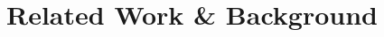 \begin{comment}
While generic PCI-Passthrough can be used with IOMMU technologies to pass through various PCI-Express devices, GPUs represent a special case which has hampered usage until only recently. In traditional usage, GPUs usually serve as VGA devices primarily to render screen output and while the purposes of scientific computing using GPUs do not require this function, it still exists in legacy. In GPU-Passthrough, another VGA device (such as onboard graphics built into the motherboard) is necessary to serve as the primary display for the host, as well as providing emulated VGA devices for each guest VM. Most GPUs also have a video bios that requires full inititialization and reset functions, which is often difficult due to the proprietary nature of the cards and their drivers. 

There is a wide range of implementation differences of PCI-Passthrough between the hypervisors studies in this manuscript. However, type 1 and 2 hypervisors such as KVM, Xen, and VMWare all operate on similar principals. LXC, a linux container solution, does not use traditional PCI-Passthrough of GPUs, as described later.  For hypervisors, the IOMMU must first be built into the kernel and enabled within the kernel bootloader parameters. This allows DMA and interrupt mechanisms to be properly initialized before any devices are initialized. Next, the original device's drivers must be blacklisted, either within the kernel or directly as a module to ensure the PCI device (in our case the GPU) is not initialized by the host. Later in the boot order, a hypervisor specific module will sieze the device to prevent any furter initialization or tampering, while also making the device visible to the host. In KVM, this is accomplished with the new vgio driver to seize a GPU whenb booting. Xen uses the pci-back driver and VMWare leverages their VMDirectPath I/O mechanism for similar results. During guest VM creation, the hypervisor will relinquish control of the PCI device and the device will be passed through to the guest. Finally, the VM can load standard drivers and use the device as expected, in our case for scientific computing problems.


\end{comment}



\section{Related Work \& Background}\label{RELATED}

